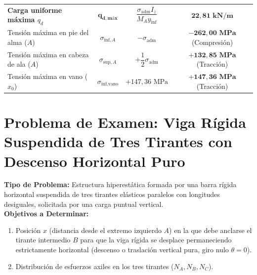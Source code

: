 \begin{table}[H]
{\begin{tabular}{lccc}
            \midrule
            \textbf{Carga uniforme máxima $q_d$}& $\mathbf{q_{d,\text{máx}}}$                                      & $\dfrac{\sigma_{\text{adm}} I_z}{M_A y_{\text{inf}}}$ & $\mathbf{22{,}81\text{ kN/m}}$      \\[6pt]
            Tensión máxima en pie del alma ($A$)& $\sigma_{\text{inf}, A}$                                         & $-\sigma_{\text{adm}}$                  & $\mathbf{-262{,}00\text{ MPa}}$ (Compresión)        \\[4pt]
            Tensión máxima en cabeza de ala ($A$)& $\sigma_{\text{sup}, A}$                                        & $+\dfrac{1}{2}\sigma_{\text{adm}}$      & $\mathbf{+132{,}85\text{ MPa}}$ (Tracción)          \\[4pt]
            Tensión máxima en vano ($x_0$)    & $\sigma_{\text{inf}, \text{vano}}$                                 & $+147{,}36\text{ MPa}$                  & $\mathbf{+147{,}36\text{ MPa}}$ (Tracción)          \\
            \bottomrule
        \end{tabular}%
    }
    \label{tab:resumen_examen_viga_T}
\end{table}

\section{Problema de Examen: Viga Rígida Suspendida de Tres Tirantes con Descenso Horizontal Puro}

\begin{tcolorbox}[colback=white, colframe=myb!80!black, arc=4pt, boxrule=0.9pt, left=8pt, right=8pt, top=7pt, bottom=7pt]
    \textbf{Tipo de Problema:} Estructura hiperestática formada por una barra rígida horizontal suspendida de tres tirantes elásticos paralelos con longitudes desiguales, solicitada por una carga puntual vertical.\\
    \textbf{Objetivos a Determinar:}
    \begin{enumerate}
        \item Posición $x$ (distancia desde el extremo izquierdo $A$) en la que debe anclarse el tirante intermedio $B$ para que la viga rígida se desplace permaneciendo estrictamente horizontal (descenso o traslación vertical pura, giro nulo $\theta = 0$).
        \item Distribución de esfuerzos axiles en los tres tirantes ($N_A, N_B, N_C$).
    \end{enumerate}
\end{tcolorbox}

